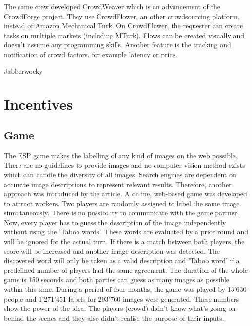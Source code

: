 The same crew developed CrowdWeaver\cite{crowdweaver} which is an advancement of the CrowdForge project. They use CrowdFlower, an other crowdsourcing platform, instead of Amazon Mechanical Turk. On CrowdFlower, the requester can create tasks on multiple markets (including MTurk). Flows can be created visually and doesn't assume any programming skills. Another feature is the tracking and notification of crowd factors, for example latency or price.

Jabberwocky

\section{Incentives}

\subsection{Game}
The ESP game\cite{esp} makes the labelling of any kind of images on the web possible. There are no guidelines to provide images and no computer vision method exists which can handle the diversity of all images. Search engines are dependent on accurate image descriptions to represent relevant results. Therefore, another approach was introduced by the article. A online, web-based game was developed to attract workers. Two players are randomly assigned to label the same image simultaneously. There is no possibility to communicate with the game partner. Now, every player has to guess the description of the image independently without using the 'Taboo words'. These words are evaluated by a prior round and will be ignored for the actual turn. If there is a match between both players, the score will be increased and another image description was detected. The discovered word will only be taken as a valid description and 'Taboo word' if a predefined number of players had the same agreement. The duration of the whole game is 150 seconds and both parties can guess as many images as possible within this time. 
During a period of four months, the game was played by 13'630 people and 1'271'451 labels for 293'760 images were generated. These numbers show the power of the idea. The players (crowd) didn't know what's going on behind the scenes and they also didn't realise the purpose of their inputs.

